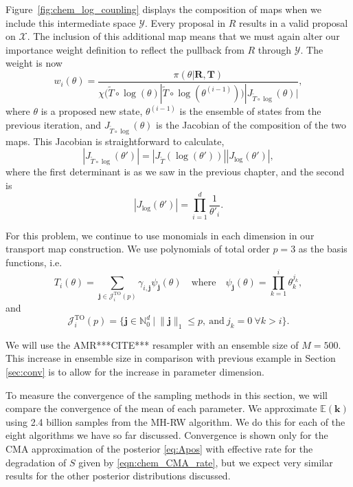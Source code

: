 \documentclass[final]{siamltex}
\begin{document}
Figure~\ref{fig:chem_log_coupling} displays the composition of maps when we include this intermediate space $\mathcal{Y}$. Every proposal in $R$ results in a valid proposal on $\mathcal{X}$. The inclusion of this additional map means that we must again alter our importance weight definition to reflect the pullback from $R$ through $\mathcal{Y}$. The weight is now
\[
	w_i(\theta) = \frac{\pi(\theta|\mathbf{R},\mathbf{T})}{\chi(\tilde{T}\circ\log(\theta)|\tilde{T}\circ\log(\theta^{(i-1)}))|J_{\tilde{T}\circ\log}(\theta)|},
\]
where $\theta$ is a proposed new state, $\theta^{(i-1)}$ is the ensemble of states from the previous iteration, and $J_{\tilde{T}\circ\log}(\theta)$ is the Jacobian of the composition of the two maps. This Jacobian is straightforward to calculate,
\[
	|J_{\tilde{T}\circ\log}(\theta')| = |J_{\tilde{T}}(\log(\theta'))||J_{\log}(\theta')|,
\]
where the first determinant is as we saw in the previous chapter, and the second is
\[
	|J_{\log}(\theta')| = \prod\limits_{i=1}^d \frac{1}{\theta'_i}.
\]

For this problem, we continue to use monomials in each dimension in our transport map construction. We use polynomials of total order $p=3$ as the basis functions, i.e.
\[
	T_i(\theta) = \sum_{\mathbf{j}\in\mathcal{J}^{\text{TO}}_i(p)} \gamma_{i,\mathbf{j}}\psi_{\mathbf{j}}(\theta) \quad \text{where} \quad \psi_\mathbf{j}(\theta) = \prod\limits_{k=1}^i \theta_k^{j_k},
\]
and
\[
	\mathcal{J}^{\text{TO}}_i(p) = \{\mathbf{j} \in \mathbb{N}^d_0\ |\ \|\mathbf{j}\|_1 \leq p, \ \text{and}\ j_k = 0\ \forall k > i\}.
\]

We will use the AMR***CITE*** resampler with an ensemble size of
$M=500$. This increase in ensemble size in comparison with previous
example in Section \ref{sec:conv} is to allow for the increase in parameter dimension.

To measure the convergence of the sampling methods in this section, we
will compare the convergence of the mean of each parameter. We
approximate $\mathbb{E}(\mathbf{k})$ using 2.4 billion samples from
the MH-RW algorithm. We do this for each of the eight algorithms we
have so far discussed. Convergence is shown only for the CMA
approximation of the posterior \eqref{eq:Apos} with effective rate for
the degradation of $S$ given by \eqref{eqn:chem_CMA_rate}, but we
expect very similar results for the other posterior distributions discussed.
\end{document}
